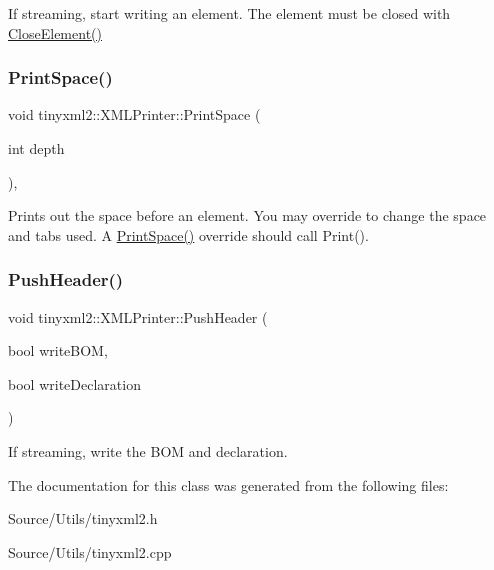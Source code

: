 If streaming, start writing an element. The element must be closed with \mbox{\hyperlink{classtinyxml2_1_1_x_m_l_printer_af1fb439e5d800999646f333fa2f0699a}{Close\+Element()}} \mbox{\label{classtinyxml2_1_1_x_m_l_printer_a1c4b2ccbe4fdb316d54f5a93f3559260}} 
\subsubsection{\texorpdfstring{Print\+Space()}{PrintSpace()}}
{\footnotesize\ttfamily void tinyxml2\+::\+X\+M\+L\+Printer\+::\+Print\+Space (\begin{DoxyParamCaption}\item[{int}]{depth }\end{DoxyParamCaption})\hspace{0.3cm}{\ttfamily [protected]}, {\ttfamily [virtual]}}

Prints out the space before an element. You may override to change the space and tabs used. A \mbox{\hyperlink{classtinyxml2_1_1_x_m_l_printer_a1c4b2ccbe4fdb316d54f5a93f3559260}{Print\+Space()}} override should call Print(). \mbox{\label{classtinyxml2_1_1_x_m_l_printer_a178c608ce8476043d5d6513819cde903}} 
\subsubsection{\texorpdfstring{Push\+Header()}{PushHeader()}}
{\footnotesize\ttfamily void tinyxml2\+::\+X\+M\+L\+Printer\+::\+Push\+Header (\begin{DoxyParamCaption}\item[{bool}]{write\+B\+OM,  }\item[{bool}]{write\+Declaration }\end{DoxyParamCaption})}

If streaming, write the B\+OM and declaration. 

The documentation for this class was generated from the following files\+:\begin{DoxyCompactItemize}
\item 
Source/\+Utils/tinyxml2.\+h\item 
Source/\+Utils/tinyxml2.\+cpp\end{DoxyCompactItemize}
